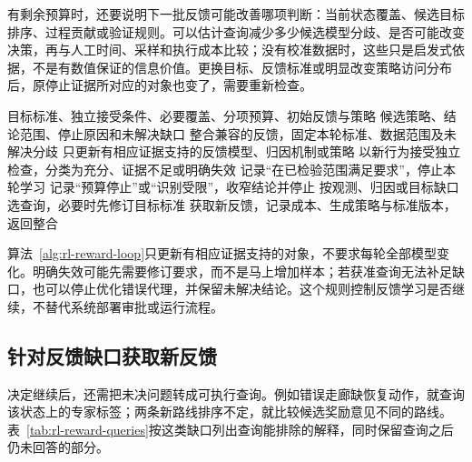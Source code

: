 有剩余预算时，还要说明下一批反馈可能改善哪项判断：当前状态覆盖、候选目标排序、过程贡献或验证规则。可以估计查询减少多少候选模型分歧、是否可能改变决策，再与人工时间、采样和执行成本比较；没有校准数据时，这些只是启发式依据，不是有数值保证的信息价值。更换目标、反馈标准或明显改变策略访问分布后，原停止证据所对应的对象也变了，需要重新检查。

\begin{algorithm}[反馈学习的继续与停止闭环]
  \label{alg:rl-reward-loop}
  \begin{algorithmic}[1]
    \Require 目标标准、独立接受条件、必要覆盖、分项预算、初始反馈与策略
    \Ensure 候选策略、结论范围、停止原因和未解决缺口
      \State 整合兼容的反馈，固定本轮标准、数据范围及未解决分歧
      \State 只更新有相应证据支持的反馈模型、归因机制或策略
      \State 以新行为接受独立检查，分类为充分、证据不足或明确失效
        \State 记录“在已检验范围满足要求”，停止本轮学习
        \State 记录“预算停止”或“识别受限”，收窄结论并停止
      \Else
        \State 按观测、归因或目标缺口选查询，必要时先修订目标标准
        \State 获取新反馈，记录成本、生成策略与标准版本，返回整合
      \EndIf
    \EndWhile
  \end{algorithmic}
\end{algorithm}

算法~\ref{alg:rl-reward-loop}只更新有相应证据支持的对象，不要求每轮全部模型变化。明确失效可能先需要修订要求，而不是马上增加样本；若获准查询无法补足缺口，也可以停止优化错误代理，并保留未解决结论。这个规则控制反馈学习是否继续，不替代系统部署审批或运行流程。

\subsection{针对反馈缺口获取新反馈}
\label{sec:rl-reward-query}

决定继续后，还需把未决问题转成可执行查询。例如错误走廊缺恢复动作，就查询该状态上的专家标签；两条新路线排序不定，就比较候选奖励意见不同的路线。表~\ref{tab:rl-reward-queries}按这类缺口列出查询能排除的解释，同时保留查询之后仍未回答的部分。

